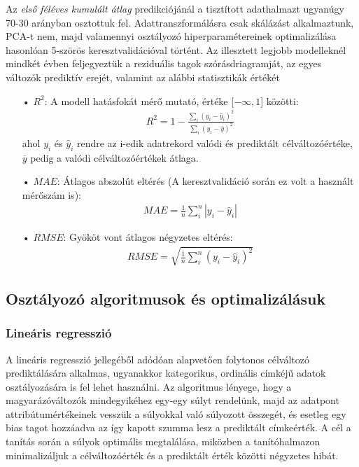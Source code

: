 \documentclass[12pt]{article}
\begin{document}
Az \textit{első féléves kumulált átlag} predikciójánál a tisztított adathalmazt ugyanúgy 70-30 arányban osztottuk fel. Adattranszformálásra csak skálázást alkalmaztunk, PCA-t nem, majd valamennyi osztályozó hiperparamétereinek optimalizálása hasonlóan 5-szörös keresztvalidációval történt. Az illesztett legjobb modelleknél mindkét évben feljegyeztük a reziduális tagok szórásdriagramját, az egyes változók prediktív erejét, valamint az alábbi statisztikák értékét\cite{bolla_stat}
\begin{itemize}
\item[•] $R^2$: A modell hatásfokát mérő mutató, értéke [$-\infty,1$] közötti:
\begin{align*}
R^2 = 1 - \frac{\sum_i (y_i - \hat{y}_i)^2}{\sum_i (y_i - \overline{y})^2}
\end{align*} 
ahol $y_i$ és $\hat{y}_i$ rendre az i-edik adatrekord valódi és prediktált célváltozóértéke, $\overline{y}$ pedig a valódi célváltozóértékek átlaga.
\item[•] $MAE$: Átlagos abszolút eltérés (A keresztvalidáció során ez volt a használt mérőszám is):
\begin{align*}
MAE = \frac{1}{n}\sum_i^n |y_i -\hat{y}_i| 
\end{align*}
\item[•] $RMSE$: Gyököt vont átlagos négyzetes eltérés:
\begin{align*}
RMSE = \sqrt{\frac{1}{n}\sum_i^n (y_i - \hat{y}_i)^2}
\end{align*}
\end{itemize}






\subsection{Osztályozó algoritmusok és optimalizálásuk}

\subsubsection{Lineáris regresszió}

A lineáris regresszió jellegéből adódóan alapvetően folytonos célváltozó prediktálására alkalmas, ugyanakkor kategorikus, ordinális címkéjű adatok osztályozására is fel lehet használni. Az algoritmus lényege, hogy a magyarázóváltozók mindegyikéhez egy-egy súlyt rendelünk, majd az adatpont attribútumértékeinek vesszük a súlyokkal való súlyozott összegét, és esetleg egy bias tagot hozzáadva az így kapott szumma lesz a prediktált címkeérték. A cél a tanítás során a súlyok optimális megtalálása, miközben a tanítóhalmazon minimalizáljuk a célváltozóérték és a prediktált érték közötti négyzetes hibát.
\end{document}
